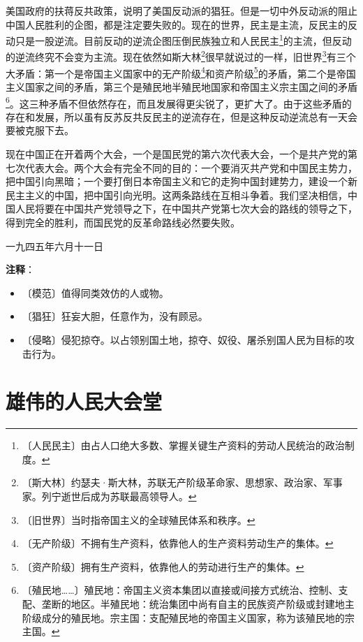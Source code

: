 \documentclass[12pt,UTF-8,openany]{ctexbook}
\begin{document}
\begin{normalsize}
    美国政府的扶蒋反共政策，说明了美国反动派的猖狂。但是一切中外反动派的阻止中国人民胜利的企图，都是注定要失败的。现在的世界，民主是主流，反民主的反动只是一股逆流。目前反动的逆流企图压倒民族独立和人民民主\footnote{〔人民民主〕由占人口绝大多数、掌握关键生产资料的劳动人民统治的政治制度。}的主流，但反动的逆流终究不会变为主流。现在依然如斯大林\footnote{〔斯大林〕约瑟夫·斯大林，苏联无产阶级革命家、思想家、政治家、军事家。列宁逝世后成为苏联最高领导人。}很早就说过的一样，旧世界\footnote{〔旧世界〕当时指帝国主义的全球殖民体系和秩序。}有三个大矛盾：第一个是帝国主义国家中的无产阶级\footnote{〔无产阶级〕不拥有生产资料，依靠他人的生产资料劳动生产的集体。}和资产阶级\footnote{〔资产阶级〕拥有生产资料，依靠他人的劳动进行生产的集体。}的矛盾，第二个是帝国主义国家之间的矛盾，第三个是殖民地半殖民地国家和帝国主义宗主国之间的矛盾\footnote{〔殖民地……〕殖民地：帝国主义资本集团以直接或间接方式统治、控制、支配、垄断的地区。半殖民地：统治集团中尚有自主的民族资产阶级或封建地主阶级成分的殖民地。宗主国：支配殖民地的帝国主义国家，称为该殖民地的宗主国。}。这三种矛盾不但依然存在，而且发展得更尖锐了，更扩大了。由于这些矛盾的存在和发展，所以虽有反苏反共反民主的逆流存在，但是这种反动逆流总有一天会要被克服下去。
    
    现在中国正在开着两个大会，一个是国民党的第六次代表大会，一个是共产党的第七次代表大会。两个大会有完全不同的目的：一个要消灭共产党和中国民主势力，把中国引向黑暗；一个要打倒日本帝国主义和它的走狗中国封建势力，建设一个新民主主义的中国，把中国引向光明。这两条路线在互相斗争着。我们坚决相信，中国人民将要在中国共产党领导之下，在中国共产党第七次大会的路线的领导之下，得到完全的胜利，而国民党的反革命路线必然要失败。
    
    \hfill 一九四五年六月十一日
    
\end{normalsize}


\newpage

\textbf{注释}：

\vspace{-1em}

\begin{itemize}
    \setlength\itemsep{-0.2em}
    \item 〔模范〕值得同类效仿的人或物。
    \item 〔猖狂〕狂妄大胆，任意作为，没有顾忌。
    \item 〔侵略〕侵犯掠夺。以占领别国土地，掠夺、奴役、屠杀别国人民为目标的攻击行为。
\end{itemize}

\chapter{雄伟的人民大会堂}
\end{document}
